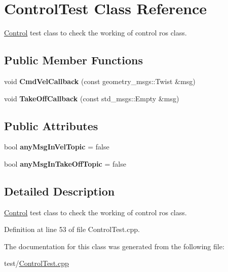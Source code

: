 \hypertarget{class_control_test}{}\section{Control\+Test Class Reference}
\label{class_control_test}


\hyperlink{class_control}{Control} test class to check the working of control ros class.  


\subsection*{Public Member Functions}
\begin{DoxyCompactItemize}
\item 
void {\bfseries Cmd\+Vel\+Callback} (const geometry\+\_\+msgs\+::\+Twist \&msg)\hypertarget{class_control_test_a7af0ddb0a269fa579c2e1fce83b57853}{}\label{class_control_test_a7af0ddb0a269fa579c2e1fce83b57853}

\item 
void {\bfseries Take\+Off\+Callback} (const std\+\_\+msgs\+::\+Empty \&msg)\hypertarget{class_control_test_ad0e7fc225c2b2d841b13c2a0ae3d0711}{}\label{class_control_test_ad0e7fc225c2b2d841b13c2a0ae3d0711}

\end{DoxyCompactItemize}
\subsection*{Public Attributes}
\begin{DoxyCompactItemize}
\item 
bool {\bfseries any\+Msg\+In\+Vel\+Topic} = false\hypertarget{class_control_test_a70717f7cdcb47edd6562a8184b41b49a}{}\label{class_control_test_a70717f7cdcb47edd6562a8184b41b49a}

\item 
bool {\bfseries any\+Msg\+In\+Take\+Off\+Topic} = false\hypertarget{class_control_test_af68696571024f0e25adbf07e402a2001}{}\label{class_control_test_af68696571024f0e25adbf07e402a2001}

\end{DoxyCompactItemize}


\subsection{Detailed Description}
\hyperlink{class_control}{Control} test class to check the working of control ros class. 

Definition at line 53 of file Control\+Test.\+cpp.



The documentation for this class was generated from the following file\+:\begin{DoxyCompactItemize}
\item 
test/\hyperlink{_control_test_8cpp}{Control\+Test.\+cpp}\end{DoxyCompactItemize}
